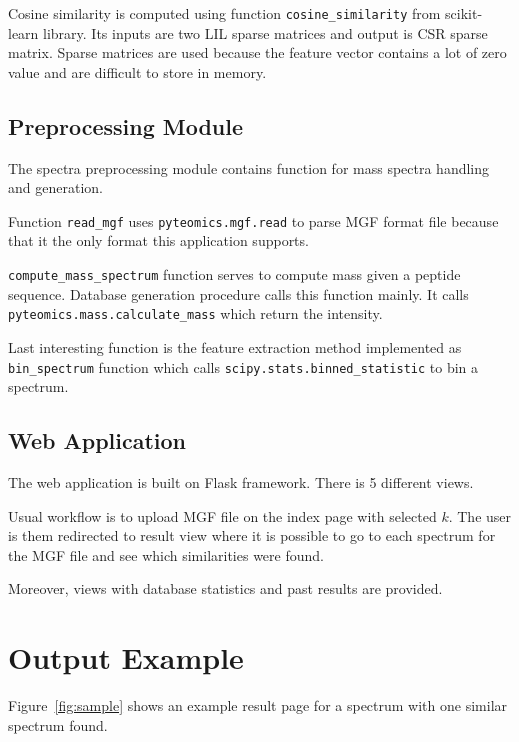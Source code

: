 \documentclass[a4paper,10pt,twocolumn]{article}
\begin{document}
Cosine similarity is computed using function \texttt{cosine\_similarity}
from scikit-learn library. Its inputs are two LIL sparse matrices and output
is CSR sparse matrix. Sparse matrices are used because the feature vector
contains a lot of zero value and are difficult to store in memory.

\subsection{Preprocessing Module}

The spectra preprocessing module contains function for mass spectra
handling and generation.

Function \texttt{read\_mgf} uses
\texttt{pyteomics.mgf.read} to parse MGF format file because that it the
only format this application supports.

\texttt{compute\_mass\_spectrum} function serves to
compute mass given a peptide sequence.
Database generation procedure calls this function mainly.
It calls \texttt{pyteomics.mass.calculate\_mass} which return the intensity.

Last interesting function is the feature extraction method implemented as
\texttt{bin\_spectrum} function which calls
\texttt{scipy.stats.binned\_statistic} to bin a spectrum.

\subsection{Web Application}

The web application is built on Flask framework. There is 5 different
views.

Usual workflow is to upload MGF file on the index page with
selected \(k\). The user is them redirected to result view where it is
possible to go to each spectrum for the MGF file and see which similarities
were found.

Moreover, views with database statistics and past results are provided. 

\section{Output Example}

Figure~\ref{fig:sample} shows an example result page for a spectrum with 
one similar spectrum found.
\end{document}
